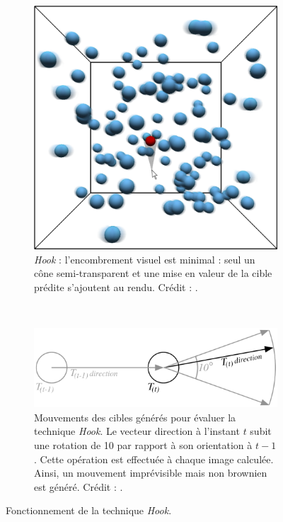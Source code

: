 	\begin{figure}[!htb]
		\begin{subfigure}{.29\textwidth}
			\centering
			\includegraphics[width=\textwidth]{figures/ch2/hookPic}
			\caption[\emph{Hook} -- fonctionnement]{\emph{Hook} : l'encombrement visuel est minimal : seul un cône semi-transparent et une mise en valeur de la cible prédite s'ajoutent au rendu. Crédit : \cite{ortega2013hook}.}
			\label{fig:hookPic}
		\end{subfigure}
		~
		\begin{subfigure}{.69\textwidth}
			\centering
			\includegraphics[width=\textwidth]{figures/ch2/hookDir}
			\caption[\emph{Hook} -- mouvements des cibles]{Mouvements des cibles générés pour évaluer la technique \emph{Hook}. Le vecteur direction à l'instant $t$ subit une rotation de 10\textdegree{} par rapport à son orientation à $t-1$. Cette opération est effectuée à chaque image calculée. Ainsi, un mouvement imprévisible mais non brownien est généré. Crédit : \cite{ortega2013hook}.}
			\label{fig:hookDir}
		\end{subfigure}
		\caption[\emph{Hook} -- fonctionnement]{Fonctionnement de la technique \emph{Hook}.}
		\label{fig:hook}
	\end{figure}
	
